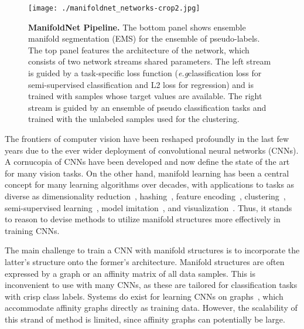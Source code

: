 \documentclass{bmvc2k}
\def\eg{\emph{e.g}\bmvaOneDot}
\begin{document}
\begin{figure}[!tb]
\centering
\texttt{[image: ./manifoldnet\_networks-crop2.jpg]} 
\vspace{2mm}
\caption{\textbf{ManifoldNet Pipeline.} The bottom panel shows ensemble manifold segmentation (EMS) for the ensemble of pseudo-labels. The top panel features the architecture of the network, which consists of two network streams shared parameters. The left stream is
guided by a task-specific loss function (\eg classification loss for semi-supervised classification and L2 loss for regression) and is trained with samples whose target values are available. The right stream is guided by an ensemble of pseudo classification tasks and trained with the unlabeled samples used for the clustering.}
\label{fig:pipeline} 
\vspace{-3mm}
\end{figure}

The frontiers of computer vision have been reshaped profoundly in the
last few years due to the ever wider deployment of convolutional neural networks
(CNNs). A cornucopia of CNNs have been developed and now define the
state of the art for many vision tasks. On the other hand, manifold learning has been a central
concept for many learning algorithms over decades, with
applications to tasks as diverse as dimensionality
reduction~\cite{lle:science:00,isomap},
hashing~\cite{manifold:hashing}, 
feature encoding~\cite{siftllc:CVPR10},
clustering~\cite{manifold:clustering,sparse:manifold:clustering},
semi-supervised learning~\cite{Belkin:semiframe:2006}, 
model imitation~\cite{dai:metric:imitation}, and
visualization~\cite{manifold:visualizing}. 
Thus, it stands to reason to devise methods to  utilize manifold structures more effectively in training CNNs. 

The main challenge to train a CNN with manifold structures is to incorporate
the latter's structure onto the former's architecture. Manifold structures are often
expressed by a graph or an affinity matrix of all data samples. This is inconvenient to use with many CNNs, as these are tailored for classification tasks with crisp class labels. Systems do exist for learning CNNs on graphs~\cite{bruna2013spectral,cnn:graph, learning:cnn:graph}, which accommodate affinity graphs directly as training data. However, the scalability of this strand of method is limited, since affinity graphs can potentially be large. 

\end{document}
